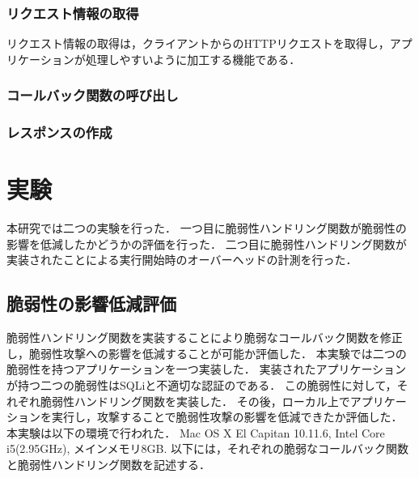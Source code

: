 \documentclass[a4paper,12pt]{jreport}
\begin{document}
\subsection{リクエスト情報の取得}
リクエスト情報の取得は，クライアントからのHTTPリクエストを取得し，アプリケーションが処理しやすいように加工する機能である．

\subsection{コールバック関数の呼び出し}

\subsection{レスポンスの作成}

\chapter{実験}
本研究では二つの実験を行った．
一つ目に脆弱性ハンドリング関数が脆弱性の影響を低減したかどうかの評価を行った．
二つ目に脆弱性ハンドリング関数が実装されたことによる実行開始時のオーバーヘッドの計測を行った．

\section{脆弱性の影響低減評価}
脆弱性ハンドリング関数を実装することにより脆弱なコールバック関数を修正し，脆弱性攻撃への影響を低減することが可能か評価した．
本実験では二つの脆弱性を持つアプリケーションを一つ実装した．
実装されたアプリケーションが持つ二つの脆弱性はSQLiと不適切な認証のである．
この脆弱性に対して，それぞれ脆弱性ハンドリング関数を実装した．
その後，ローカル上でアプリケーションを実行し，攻撃することで脆弱性攻撃の影響を低減できたか評価した．
本実験は以下の環境で行われた．
Mac OS X El Capitan 10.11.6, Intel Core i5(2.95GHz), メインメモリ8GB.
以下には，それぞれの脆弱なコールバック関数と脆弱性ハンドリング関数を記述する．
\end{document}
